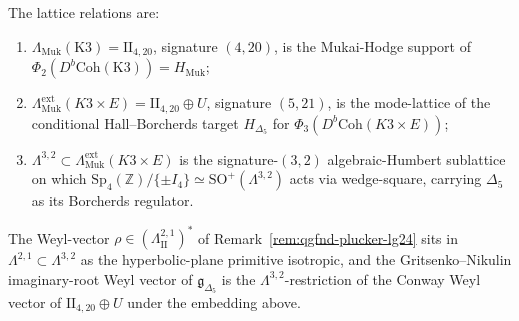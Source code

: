 \begin{proposition}
The lattice relations are:
\begin{enumerate}
 \item[\textup{(i)}] $\Lambda_{\mathrm{Muk}}(\mathrm{K3})=\mathrm{II}_{4,20}$,
 signature $(4,20)$, is the Mukai-Hodge support of $\Phi_2(D^b\mathrm{Coh}(\mathrm{K3}))=H_{\mathrm{Muk}}$;
 \item[\textup{(ii)}] $\Lambda_{\mathrm{Muk}}^{\mathrm{ext}}(K3\times E)=\mathrm{II}_{4,20}\oplus U$,
 signature $(5,21)$, is the mode-lattice of the conditional
 Hall--Borcherds target $H_{\Delta_5}$ for
 $\Phi_3(D^b\mathrm{Coh}(K3\times E))$;
 \item[\textup{(iii)}] $\Lambda^{3,2}\subset\Lambda_{\mathrm{Muk}}^{\mathrm{ext}}(K3\times E)$
 is the signature-$(3,2)$ algebraic-Humbert sublattice on which
 $\mathrm{Sp}_4(\mathbb Z)/\{\pm I_4\}\simeq\mathrm{SO}^+(\Lambda^{3,2})$
 acts via wedge-square, carrying $\Delta_5$ as its Borcherds regulator.
\end{enumerate}
The Weyl-vector $\rho\in(\Lambda_{\mathrm{II}}^{2,1})^*$ of
Remark~\ref{rem:qgfnd-plucker-lg24} sits in $\Lambda^{2,1}\subset\Lambda^{3,2}$
as the hyperbolic-plane primitive isotropic, and the Gritsenko--Nikulin
imaginary-root Weyl vector of $\mathfrak g_{\Delta_5}$ is the
$\Lambda^{3,2}$-restriction of the Conway Weyl vector of
$\mathrm{II}_{4,20}\oplus U$ under the embedding above.
\end{proposition}

